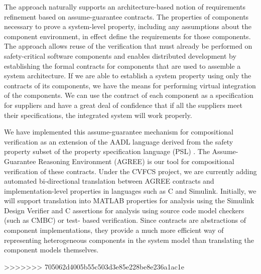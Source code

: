 The approach naturally supports an architecture-based notion of requirements refinement based on assume-guarantee contracts. The properties of components necessary to prove a system-level property, including any assumptions about the component environment, in effect define the requirements for those components. The approach allows reuse of the verification that must already be performed on safety-critical software components and enables distributed development by establishing the formal contracts for components that are used to assemble a system architecture. If we are able to establish a system property using only the contracts of its components, we have the means for performing virtual integration of the components. We can use the contract of each component as a specification for suppliers and have a great deal of confidence that if all the suppliers meet their specifications, the integrated system will work properly.

We have implemented this assume-guarantee mechanism for compositional verification as an extension of the AADL language derived from the safety property subset of the property specification language (PSL) \cite{IEEE:PSL}. The Assume-Guarantee Reasoning Environment (AGREE) is our tool for compositional verification of these contracts. Under the CVFCS project, we are currently adding automated bi-directional translation between AGREE contracts and implementation-level properties in languages such as C and Simulink. Initially, we will support translation into MATLAB properties for analysis using the Simulink Design Verifier and C assertions for analysis using source code model checkers (such as CMBC) or test- based verification. Since contracts are abstractions of component implementations, they provide a much more efficient way of representing heterogeneous components in the system model than translating the component models themselves.

>>>>>>> 705062d4005b55c503d3e85e228be8e236a1ac1e

\fi

